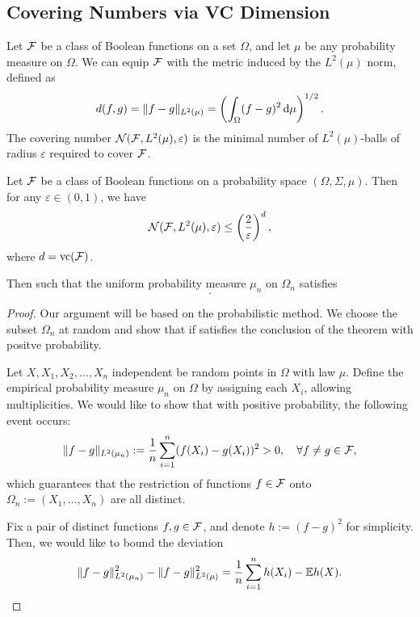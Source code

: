 \subsection{Covering Numbers via VC Dimension}

Let \(\mathcal{F}\) be a class of Boolean functions on a set \(\Omega\), and let \(\mu\) be any probability measure on \(\Omega\). We can equip \(\mathcal{F}\) with the metric induced by the \(L^{2}(\mu)\) norm, defined as
\begin{equation*}
	d(f,g)=\|f-g\|_{L^{2}(\mu)}=\left(\int_{\Omega}(f-g)^{2}\mathop{}\!\mathrm{d}\mu\right)^{1/2}.
\end{equation*}
The covering number \(\mathcal{N}(\mathcal{F}, L^{2}(\mu), \varepsilon)\) is the minimal number of \(L^{2}(\mu)\)-balls of radius \(\varepsilon\) required to cover \(\mathcal{F}\).

\begin{theorem}\label{thm:covering-numbers-vc-dimension}
	Let \(\mathcal{F}\) be a class of Boolean functions on a probability space \((\Omega,\Sigma,\mu)\). Then for any \(\varepsilon\in(0,1)\), we have
	\begin{equation*}
		\mathcal{N}(\mathcal{F},L^{2}(\mu),\varepsilon)\leq\left(\frac{2}{\varepsilon}\right)^{d},
	\end{equation*}
	where \(d=\text{vc}(\mathcal{F})\).
\end{theorem}

\begin{lemma}

	Then such that the uniform probability measure \(\mu_{n}\) on \(\Omega_{n}\) satisfies
	\begin{equation*}
		.
	\end{equation*}
\end{lemma}

\begin{proof}
	Our argument will be based on the probabilistic method. We choose the subset \(\Omega_{n}\) at random and show that if satisfies the conclusion of the theorem with positve probability.

	Let \(X,X_{1},X_{2},\ldots,X_{n}\) independent be random points in \(\Omega\) with law \(\mu\). Define the empirical probability measure \(\mu_{n}\) on \(\Omega\) by assigning each \(X_{i}\), allowing multiplicities. We would like to show that with positive probability, the following event occurs:
	\begin{equation*}
		\|f-g\|_{L^{2}(\mu_{n})}:=\frac{1}{n}\sum_{i=1}^{n}(f(X_{i})-g(X_{i}))^{2}>0,\quad\forall f\neq g\in\mathcal{F},
	\end{equation*}
	which guarantees that the restriction of functions \(f\in\mathcal{F}\) onto \(\Omega_{n}:=(X_{1},\ldots,X_{n})\) are all distinct.

	Fix a pair of distinct functions \(f,g\in\mathcal{F}\), and denote \(h:=(f-g)^{2}\) for simplicity. Then, we would like to bound the deviation
	\begin{equation*}
		\|f-g\|_{L^{2}(\mu_{n})}^{2}-\|f-g\|_{L^{2}(\mu)}^{2}=\frac{1}{n}\sum_{i=1}^{n}h(X_{i})-\mathbb{E} h(X).
	\end{equation*}

\end{proof}

